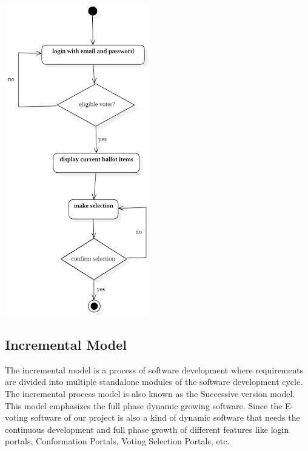 \documentclass[a4paper,12pt]{report}
\begin{document}
\includegraphics[scale=0.5]{images/ActivityDig-2.png}
  
               

\subsection{Incremental Model}
The incremental model is a process of software development where requirements are divided into multiple standalone modules of the software development cycle. The incremental process model is also known as the Successive version model. This model emphasizes the full phase dynamic growing software. Since the E-voting software of our project is also a kind of dynamic software that needs the continuous development and full phase growth of different features like login portals, Conformation Portals, Voting Selection Portals, etc.\\
\end{document}
